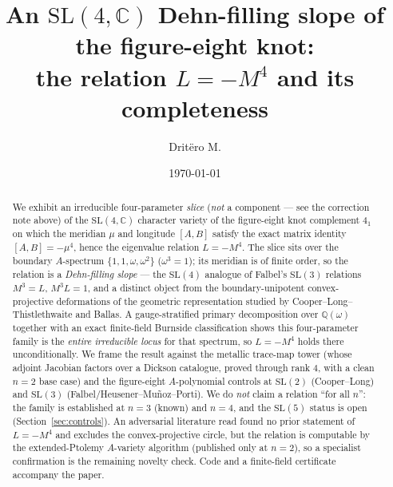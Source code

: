 \documentclass[11pt,reqno]{amsart}
\theoremstyle{plain}
\theoremstyle{definition}
\theoremstyle{remark}
\newcommand{\SL}{\mathrm{SL}}
\newcommand{\C}{\mathbb{C}}
\newcommand{\Q}{\mathbb{Q}}
\begin{document}
\title[An SL(4,C) Dehn-filling slope of the figure-eight knot]{An $\SL(4,\C)$ Dehn-filling slope of the figure-eight knot:\\ the relation $L=-M^4$ and its completeness}
\author{Dritëro M.}
\address{Independent researcher, Prishtina.}
\date{\today}

\begin{center}\end{center}

\begin{abstract}
We exhibit an irreducible four-parameter \emph{slice} (\emph{not} a component --- see the correction note
above) of the $\SL(4,\C)$ character variety of the figure-eight knot complement $4_1$ on which the meridian
$\mu$ and longitude $[A,B]$ satisfy the exact matrix identity $[A,B]=-\mu^4$, hence the eigenvalue relation
$L=-M^4$. The slice sits over the
boundary $A$-spectrum $\{1,1,\omega,\omega^2\}$ ($\omega^3=1$); its meridian is of finite order, so the
relation is a \emph{Dehn-filling slope} --- the $\SL(4)$ analogue of Falbel's $\SL(3)$ relations $M^3=L$,
$M^3L=1$, and a distinct object from the boundary-unipotent convex-projective deformations of the
geometric representation studied by Cooper--Long--Thistlethwaite and Ballas. A gauge-stratified primary
decomposition over $\Q(\omega)$ together with an exact finite-field Burnside classification shows this
four-parameter family is the \emph{entire irreducible locus} for that spectrum, so $L=-M^4$ holds there
unconditionally. We frame the result against the metallic trace-map tower (whose adjoint Jacobian factors
over a Dickson catalogue, proved through rank $4$, with a clean $n=2$ base case) and the figure-eight
$A$-polynomial controls at $\SL(2)$ (Cooper--Long) and $\SL(3)$ (Falbel/Heusener--Mu\~noz--Porti). We do
\emph{not} claim a relation ``for all $n$'': the family is established at $n=3$ (known) and $n=4$, and the
$\SL(5)$ status is open (Section~\ref{sec:controls}). An adversarial literature read found no prior
statement of $L=-M^4$ and excludes the convex-projective circle, but the relation is computable by the
extended-Ptolemy $A$-variety algorithm (published only at $n=2$), so a specialist confirmation is the
remaining novelty check. Code and a finite-field certificate accompany the paper.
\end{abstract}
\end{document}
